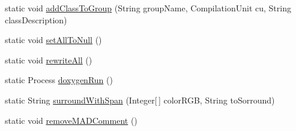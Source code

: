 \begin{DoxyCompactItemize}
\item 
static void \hyperlink{classit_1_1isislab_1_1masonassisteddocumentation_1_1mason_1_1analizer_1_1_global_utility_a7f9ad44f1c41eeafbdb4cd2c4674df40}{add\-Class\-To\-Group} (String group\-Name, Compilation\-Unit cu, String class\-Description)
\item 
static void \hyperlink{classit_1_1isislab_1_1masonassisteddocumentation_1_1mason_1_1analizer_1_1_global_utility_aebc7c44f38977c31459b826f96edde2d}{set\-All\-To\-Null} ()
\item 
static void \hyperlink{classit_1_1isislab_1_1masonassisteddocumentation_1_1mason_1_1analizer_1_1_global_utility_aa40dbda52b50a72ff9589cda19f9bc38}{rewrite\-All} ()
\item 
static Process \hyperlink{classit_1_1isislab_1_1masonassisteddocumentation_1_1mason_1_1analizer_1_1_global_utility_a0b0db96cff45244361ff11e4e176b420}{doxygen\-Run} ()
\item 
static String \hyperlink{classit_1_1isislab_1_1masonassisteddocumentation_1_1mason_1_1analizer_1_1_global_utility_a34ef4730213af90fec963a5b86f992b4}{surround\-With\-Span} (Integer\mbox{[}$\,$\mbox{]} color\-R\-G\-B, String to\-Sorround)
\item 
static void \hyperlink{classit_1_1isislab_1_1masonassisteddocumentation_1_1mason_1_1analizer_1_1_global_utility_ad02ba62959ec41669d79ca380c1c2f82}{remove\-M\-A\-D\-Comment} ()
\end{DoxyCompactItemize}
